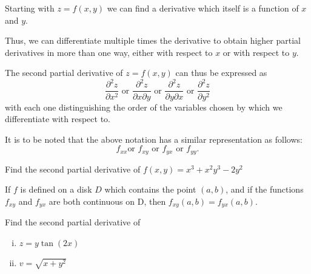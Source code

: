 

Starting with $z = f(x,y)$ we can find a derivative which itself is a function of
$x$ and $y$.

Thus, we can differentiate multiple times the derivative to obtain higher partial
derivatives in more than one way, either with respect to $x$ or with respect to $y$.

The second partial derivative of $z = f(x,y)$ can thus be expressed as
\[\frac{\partial^2 z}{\partial x^2} \text{ or } \frac{\partial^2 z}{\partial x
\partial y} \text{ or } \frac{\partial^2 z}{\partial y \partial x} \text{ or }
\frac{\partial^2 z}{\partial y^2} \] with each one distinguishing the order of
the variables chosen by which we differentiate with respect to.

It is to be noted that the above notation has a similar representation as follows: \[f_{xx} \text{
	or } f_{xy} \text{ or } f_{yx} 	\text{ or } f_{yy}.\]
\begin{example}
	Find the second partial derivative of $f(x, y) = x^3 +x^2y^3 -2y^2$
\end{example}

\begin{theorem}
	If $f$ is defined on a disk $D$ which contains the point $(a,b)$, and if the
	functions $f_{xy}$ and $f_{yx}$ are both continuous on D, then $f_{xy}(a,b) =
	f_{yx}(a,b)$.
\end{theorem}

\begin{example}
	Find the second partial derivative of
	\begin{enumerate}[i)]
		\item $z=y\tan(2x)$
		\item $v=\sqrt{x+y^2}$
	\end{enumerate}
\end{example}
